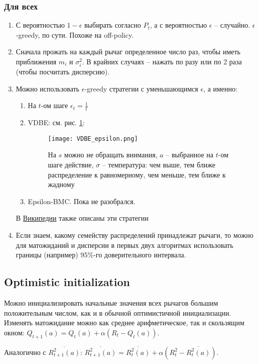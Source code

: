 \documentclass{article}
\begin{document}
\subsubsection{Для всех}
\begin{enumerate}
    \item С вероятностью $1-\epsilon$ выбирать согласно $P_t$, а с вероятностью $\epsilon$ -- случайно. $\epsilon$-greedy, по сути. Похоже на off-policy.
    \item Сначала прожать на каждый рычаг определенное число раз, чтобы иметь приближения $m_i$ и $\sigma_i^2$. В крайних случаях -- нажать по разу или по 2 раза (чтобы посчитать дисперсию).
    \item Можно использовать $\epsilon$-greedy стратегии с уменьшающимся $\epsilon$, а именно:
    \begin{enumerate}
        \item На $t$-ом шаге $\epsilon_t = \frac{1}{t}$ \cite{srank}
        \item VDBE: см. рис. \ref{fig:VDBE_epsilon}:
        \begin{figure}
            \texttt{[image: VDBE\_epsilon.png]}
            \caption{\label{fig:VDBE_epsilon} На $s$ можно не обращать внимания, $a$ -- выбранное на $t$-ом шаге действие, $\sigma$ -- температура: чем выше, тем ближе распределение к равномерному, чем меньше, тем ближе к жадному \cite{tolic_VDBE}}
        \end{figure}
        \item Epsilon-BMC. Пока не разобрался.
    \end{enumerate}
    В \href{https://en.wikipedia.org/wiki/Multi-armed_bandit}{Википедии} также описаны эти стратегии
    \item Если знаем, какому семейству распределений принадлежат рычаги, то можно для матожиданий и дисперсии в первых двух алгоритмах использовать границы (например) $95\%$-го доверительного интервала.
\end{enumerate}

\subsection{Optimistic initialization}
Можно инициализировать начальные значения всех рычагов большим положительным числом, как и в обычной оптимистичной инициализации. Изменять матожидание можно как среднее арифметическое, так и скользящим окном: $Q_{t+1}(a) = Q_t(a) + \alpha (R_t - Q_t(a))$.

Аналогично с $\overline{R_{t+1}^2(a)}$: $\overline{R_{t+1}^2(a)} = \overline{R_{t}^2(a)} + \alpha (R_t^2 - \overline{R_{t}^2(a)})$.
\end{document}
